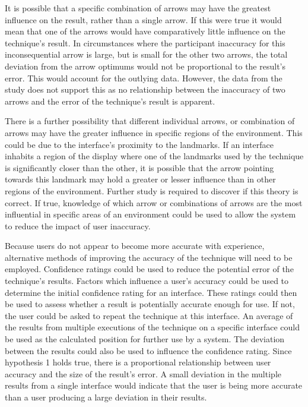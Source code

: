 \documentclass{bmcart}
\begin{document}
It is possible that a specific combination of arrows may have the greatest influence on the result, rather than a single arrow.
If this were true it would mean that one of the arrows would have comparatively little influence on the technique's result.
In circumstances where the participant inaccuracy for this inconsequential arrow is large, but is small for the other two arrows, the total deviation from the arrow optimums would not be proportional to the result's error.
This would account for the outlying data.
However, the data from the study does not support this as no relationship between the inaccuracy of two arrows and the error of the technique's result is apparent.

There is a further possibility that different individual arrows, or combination of arrows may have the greater influence in specific regions of the environment.
This could be due to the interface's proximity to the landmarks.
If an interface inhabits a region of the display where one of the landmarks used by the technique is significantly closer than the other, it is possible that the arrow pointing towards this landmark may hold a greater or lesser influence than in other regions of the environment.
Further study is required to discover if this theory is correct.
If true, knowledge of which arrow or combinations of arrows are the most influential in specific areas of an environment could be used to allow the system to reduce the impact of user inaccuracy.

Because users do not appear to become more accurate with experience, alternative methods of improving the accuracy of the technique will need to be employed.
Confidence ratings could be used to reduce the potential error of the technique's results.
Factors which influence a user's accuracy could be used to determine the initial confidence rating for an interface.
These ratings could then be used to assess whether a result is potentially accurate enough for use.
If not, the user could be asked to repeat the technique at this interface.
An average of the results from multiple executions of the technique on a specific interface could be used as the calculated position for further use by a system.
The deviation between the results could also be used to influence the confidence rating.
Since hypothesis 1 holds true, there is a proportional relationship between user accuracy and the size of the result's error.
A small deviation in the multiple results from a single interface would indicate that the user is being more accurate than a user producing a large deviation in their results.
\end{document}
